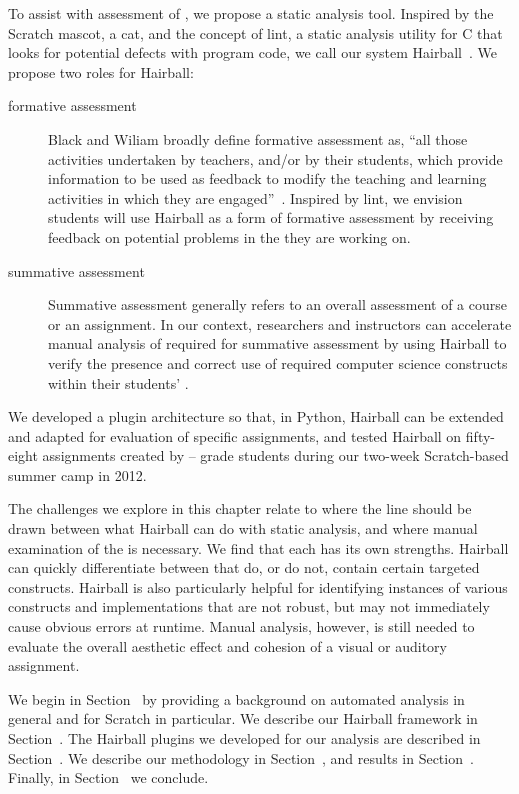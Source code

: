 To assist with assessment of , we propose a static analysis tool.
Inspired by the Scratch mascot, a cat, and the concept of lint, a static
analysis utility for C that looks for potential defects with program code, we
call our system Hairball~\cite{Johnson78lint}. We propose two roles for
Hairball:

\begin{description}
\item[formative assessment] Black and Wiliam broadly define formative
  assessment as, ``all those activities undertaken by teachers, and/or by their
  students, which provide information to be used as feedback to modify the
  teaching and learning activities in which they are
  engaged''~\cite{black1998assessment}. Inspired by lint, we envision students
  will use Hairball as a form of formative assessment by receiving feedback on
  potential problems in the  they are working on.
\item[summative assessment] Summative assessment generally refers to an overall
  assessment of a course or an assignment. In our context, researchers and
  instructors can accelerate manual analysis of  required for
  summative assessment by using Hairball to verify the presence and correct use
  of required computer science constructs within their students' .
\end{description}

We developed a plugin architecture so that, in Python, Hairball can be extended
and adapted for evaluation of specific assignments, and tested Hairball on
fifty-eight assignments created by -- grade students during our
two-week Scratch-based summer camp in 2012.

The challenges we explore in this chapter relate to where the line should be
drawn between what Hairball can do with static analysis, and where manual
examination of the \sprogram{} is necessary.  We find that each has its own
strengths.  Hairball can quickly differentiate between  that do, or
do not, contain certain targeted constructs. Hairball is also particularly
helpful for identifying instances of various constructs and implementations
that are not robust, but may not immediately cause obvious errors at runtime.
Manual analysis, however, is still needed to evaluate the overall aesthetic
effect and cohesion of a visual or auditory assignment.

We begin in Section~ by providing a background on
automated analysis in general and for Scratch in particular. We describe our
Hairball framework in Section~. The Hairball plugins we
developed for our analysis are described in Section~. We
describe our methodology in Section~, and results in
Section~. Finally, in Section~ we
conclude.
